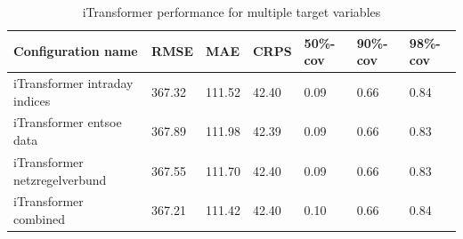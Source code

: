 \documentclass[class=scrbook, crop=false]{standalone}
\begin{document}
 \begin{table}[]
\centering
\begin{tabular}{l|l|l|l|l|l|l}
 Configuration name			&  RMSE 	& MAE 	& CRPS 	& 50\%-cov & 90\%-cov & 98\%-cov \\\hline
 iTransformer intraday indices 		& 367.32	&111.52	&42.40	&0.09			& 0.66	 & 0.84 \\
 iTransformer entsoe data		&  367.89	& 111.98 	&42.39	&0.09			& 0.66	 &0.83 \\
 iTransformer netzregelverbund 	& 367.55 	& 111.70	& 42.40	&0.09		 &0.66	 & 0.83\\
 iTransformer combined 		& 367.21 	& 111.42	& 42.40	& 0.10	 &0.66	 & 0.84\\
\end{tabular}
\caption{iTransformer performance for multiple target variables}
\label{Table::Performance_targets}
\end{table}
\end{document}
